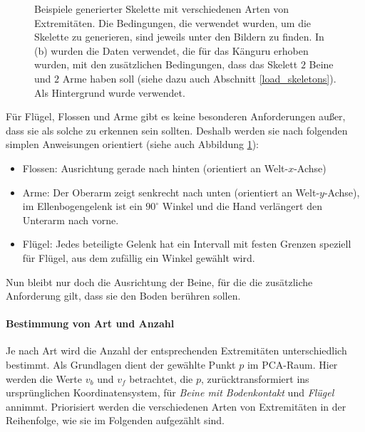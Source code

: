 \begin{figure}
 \caption{Beispiele generierter Skelette mit verschiedenen Arten von Extremitäten. Die Bedingungen, die verwendet wurden, um die Skelette zu generieren, sind jeweils unter den Bildern zu finden. In (b) wurden die Daten verwendet, die für das Känguru erhoben wurden, mit den zusätzlichen Bedingungen, dass das Skelett $2$ Beine und $2$ Arme haben soll (siehe dazu auch Abschnitt \ref{load_skeletons}). Als Hintergrund wurde \cite{background} verwendet.}
 \label{extremity_orientations}
\end{figure}

Für Flügel, Flossen und Arme gibt es keine besonderen Anforderungen außer, dass sie als solche zu erkennen sein sollten. Deshalb werden sie nach folgenden simplen Anweisungen orientiert (siehe auch Abbildung \ref{extremity_orientations}):
\begin{itemize}
 \item Flossen: Ausrichtung gerade nach hinten (orientiert an Welt-$x$-Achse)
 \item Arme: Der Oberarm zeigt senkrecht nach unten (orientiert an Welt-$y$-Achse), im Ellenbogengelenk ist ein $90^{\circ}$ Winkel und die Hand verlängert den Unterarm nach vorne.
 \item Flügel: Jedes beteiligte Gelenk hat ein Intervall mit festen Grenzen speziell für Flügel, aus dem zufällig ein Winkel gewählt wird.
\end{itemize}

Nun bleibt nur doch die Ausrichtung der Beine, für die die zusätzliche Anforderung gilt, dass sie den Boden berühren sollen.


\paragraph{Bestimmung von Art und Anzahl}

Je nach Art wird die Anzahl der entsprechenden Extremitäten unterschiedlich bestimmt. Als Grundlagen dient der gewählte Punkt $p$ im PCA-Raum. Hier werden die Werte $v_b$ und $v_f$ betrachtet, die $p$, zurücktransformiert ins ursprünglichen Koordinatensystem, für \emph{Beine mit Bodenkontakt} und \emph{Flügel} annimmt. Priorisiert werden die verschiedenen Arten von Extremitäten in der Reihenfolge, wie sie im Folgenden aufgezählt sind.

